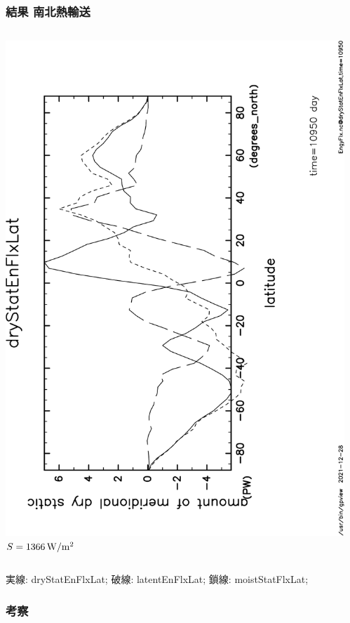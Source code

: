 \documentclass[aspectratio=149,9pt,fleqn]{beamer}
\begin{document}
\begin{frame}
	\frametitle{結果 南北熱輸送}
	\begin{columns}
		\begin{column}{.4\textwidth}
			\begin{center}
				\includegraphics[height=\textwidth,angle=-90]{S1366EngyFlx,time=10950-crop.pdf}\\
				\(S=1366\hmu{W/m^2}\)
			\end{center}
		\end{column}
		\begin{column}{.4\textwidth}
		\end{column}
	\end{columns}
	実線: dryStatEnFlxLat; 破線: latentEnFlxLat; 鎖線: moistStatFlxLat;
\end{frame}

\begin{frame}
	\frametitle{考察}
\end{frame}
\end{document}
